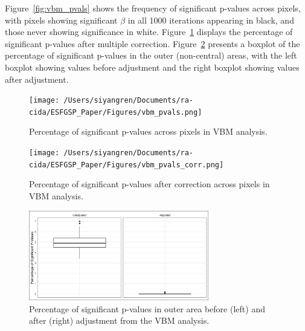 \documentclass[12pt]{article}
\begin{document}
Figure~\ref{fig:vbm_pvals} shows the frequency of significant p-values across pixels, with pixels showing significant \( \beta \) in all 1000 iterations appearing in black, and those never showing significance in white.
Figure~\ref{fig:vbm_pvals_corr} displays the percentage of significant p-values after multiple correction.
Figure~\ref{fig:vbm_boxplots} presents a boxplot of the percentage of significant p-values in the outer (non-central) areas, with the left boxplot showing values before adjustment and the right boxplot showing values after adjustment.

\begin{figure}[h]
    \centering
    \begin{minipage}[b]{0.45\textwidth}
        \texttt{[image: /Users/siyangren/Documents/ra-cida/ESFGSP\_Paper/Figures/vbm\_pvals.png]}
        \caption{Percentage of significant p-values across pixels in VBM analysis.}
        \label{fig:vbm_pvals}
    \end{minipage}
    \hfill %
    \begin{minipage}[b]{0.45\textwidth}
        \texttt{[image: /Users/siyangren/Documents/ra-cida/ESFGSP\_Paper/Figures/vbm\_pvals\_corr.png]}
        \caption{Percentage of significant p-values after correction across pixels in VBM analysis.}
        \label{fig:vbm_pvals_corr}
    \end{minipage}
\end{figure}

\begin{figure}[h]
    \centering
    \includegraphics[width=0.7\textwidth]{../Figures/vbm_boxplots.png}
    \caption{Percentage of significant p-values in outer area before (left) and after (right) adjustment from the VBM analysis.}
    \label{fig:vbm_boxplots}
\end{figure}


\end{document}
